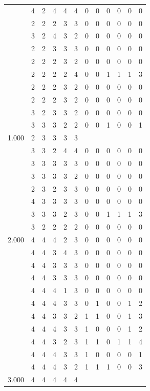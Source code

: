 \documentclass[]{msu-thesis}
\theoremstyle{definition}
\theoremstyle{definition}
\theoremstyle{definition}
\theoremstyle{remark}
\begin{document}
\begin{table}
{\begin{tabular}[t]{rrrrrrrrrrrr}
 & 4 & 2 & 4 & 4 & 4 & 0 & 0 & 0 & 0 & 0 & 0\\
 & 2 & 2 & 2 & 3 & 3 & 0 & 0 & 0 & 0 & 0 & 0\\
 & 3 & 2 & 4 & 3 & 2 & 0 & 0 & 0 & 0 & 0 & 0\\
 & 2 & 2 & 3 & 3 & 3 & 0 & 0 & 0 & 0 & 0 & 0\\
 & 2 & 2 & 2 & 3 & 2 & 0 & 0 & 0 & 0 & 0 & 0\\
 & 2 & 2 & 2 & 2 & 4 & 0 & 0 & 1 & 1 & 1 & 3\\
 & 2 & 2 & 2 & 3 & 2 & 0 & 0 & 0 & 0 & 0 & 0\\
 & 2 & 2 & 2 & 3 & 2 & 0 & 0 & 0 & 0 & 0 & 0\\
 & 3 & 2 & 3 & 3 & 2 & 0 & 0 & 0 & 0 & 0 & 0\\
 & 3 & 3 & 3 & 2 & 2 & 0 & 0 & 1 & 0 & 0 & 1\\
1.000 & 2 & 3 & 3 & 3 & 3 &  &  &  &  &  & \\
 & 3 & 3 & 2 & 4 & 4 & 0 & 0 & 0 & 0 & 0 & 0\\
 & 3 & 3 & 3 & 3 & 3 & 0 & 0 & 0 & 0 & 0 & 0\\
 & 3 & 3 & 3 & 3 & 2 & 0 & 0 & 0 & 0 & 0 & 0\\
 & 2 & 3 & 2 & 3 & 3 & 0 & 0 & 0 & 0 & 0 & 0\\
 & 4 & 3 & 3 & 3 & 3 & 0 & 0 & 0 & 0 & 0 & 0\\
 & 3 & 3 & 3 & 2 & 3 & 0 & 0 & 1 & 1 & 1 & 3\\
 & 3 & 2 & 2 & 2 & 2 & 0 & 0 & 0 & 0 & 0 & 0\\
2.000 & 4 & 4 & 4 & 2 & 3 & 0 & 0 & 0 & 0 & 0 & 0\\
 & 4 & 4 & 3 & 4 & 3 & 0 & 0 & 0 & 0 & 0 & 0\\
 & 4 & 4 & 3 & 3 & 3 & 0 & 0 & 0 & 0 & 0 & 0\\
 & 4 & 4 & 3 & 3 & 3 & 0 & 0 & 0 & 0 & 0 & 0\\
 & 4 & 4 & 4 & 1 & 3 & 0 & 0 & 0 & 0 & 0 & 0\\
 & 4 & 4 & 4 & 3 & 3 & 0 & 1 & 0 & 0 & 1 & 2\\
 & 4 & 4 & 3 & 3 & 2 & 1 & 1 & 0 & 0 & 1 & 3\\
 & 4 & 4 & 4 & 3 & 3 & 1 & 0 & 0 & 0 & 1 & 2\\
 & 4 & 4 & 3 & 2 & 3 & 1 & 1 & 0 & 1 & 1 & 4\\
 & 4 & 4 & 4 & 3 & 3 & 1 & 0 & 0 & 0 & 0 & 1\\
 & 4 & 4 & 4 & 3 & 2 & 1 & 1 & 1 & 0 & 0 & 3\\
3.000 & 4 & 4 & 4 & 4 & 4 &  &  &  &  &  & \\

\end{tabular}}
\end{table}
\end{document}
